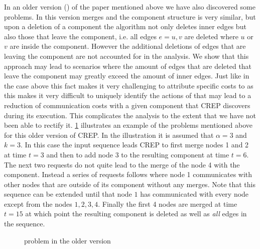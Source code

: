 \documentclass[xcolor=dvipsnames, tikz, 11pt]{article}
\newcommand{\nl}{\newline}
\newcommand{\crep}{C{\scriptsize REP}}
\newcommand{\opt}{\text{O{\scriptsize PT}}}
\newcommand{\request}[3]{\draw (axis cs:#3,#1) -- node[left]{} (axis cs:#3,#2);}
\theoremstyle{definition}
\begin{document}
	In an older version (\cite{Avin2015}) of the paper mentioned above we have also discovered some problems. In this version merges and the component structure is very similar, but upon a deletion of a component the algorithm not only deletes inner edges but also those that leave the component, i.e. all edges $e={u,v}$ are deleted where $u$ or $v$ are inside the component. However the additional deletions of edges that are leaving the component are not accounted for in the analysis. We show that this approach may lead to scenarios where the amount of edges that are deleted that leave the component may greatly exceed the amount of inner edges. Just like in the case above this fact makes it very challenging to attribute specific costs to \opt{} as this makes it very difficult to uniquely identify the actions of \opt{} that may lead to a reduction of communication costs with a given component that \crep{} discovers during its execution. This complicates the analysis to the extent that we have not been able to rectify it.\nl
	\cref{exOldCrep} illustrates an example of the problems mentioned above for this older version of \crep{}. In the illustration it is assumed that $\alpha=3$ and $k=3$. In this case the input sequence leads \crep{} to first merge nodes 1 and 2 at time $t=3$ and then to add node 3 to the resulting component at time $t= 6$. The next two requests do not quite lead to the merge of the node 4 with the component. Instead a series of requests follows where node 1 communicates with other nodes that are outside of its component without any merges. Note that this sequence can be extended until that node $1$ has communicated with every node except from the nodes $1,2,3,4$. Finally the first 4 nodes are merged at time $t=15$ at which point the resulting component is deleted as well as \textit{all} edges in the sequence. 


\begin{figure}
	\caption{problem in the older version}\label{exOldCrep}
	
\end{figure}
	
\end{document}
